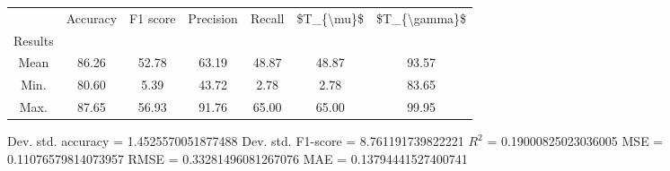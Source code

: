 \begin{tabular}{|c|c|c|c|c|c|c|}
\toprule
{} &  Accuracy &  F1 score &  Precision &  Recall &  \$T\_\{\textbackslash mu\}\$ &  \$T\_\{\textbackslash gamma\}\$ \\
Results &           &           &            &         &            &               \\
\hline
Mean    &     86.26 &     52.78 &      63.19 &   48.87 &      48.87 &         93.57 \\
Min.    &     80.60 &      5.39 &      43.72 &    2.78 &       2.78 &         83.65 \\
Max.    &     87.65 &     56.93 &      91.76 &   65.00 &      65.00 &         99.95 \\
\bottomrule
\end{tabular}

 Dev. std. accuracy = 1.4525570051877488
 Dev. std. F1-score = 8.761191739822221
 $R^2$ = 0.19000825023036005
 MSE = 0.11076579814073957
 RMSE = 0.33281496081267076
 MAE = 0.13794441527400741